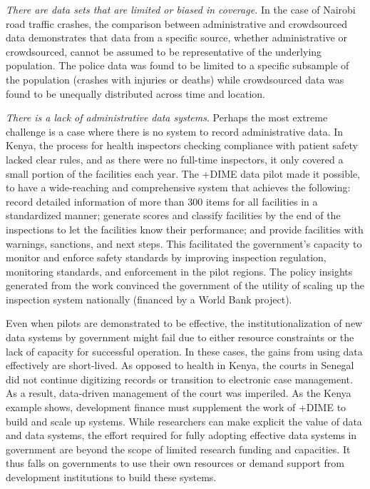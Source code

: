 \documentclass[
]{book}
\begin{document}
\emph{There are data sets that are limited or biased in coverage.} In the case of Nairobi road traffic crashes, the comparison between administrative and crowdsourced data demonstrates that data from a specific source, whether administrative or crowdsourced, cannot be assumed to be representative of the underlying population. The police data was found to be limited to a specific subsample of the population (crashes with injuries or deaths) while crowdsourced data was found to be unequally distributed across time and location.

\emph{There is a lack of administrative data systems}. Perhaps the most extreme challenge is a case where there is no system to record administrative data. In Kenya, the process for health inspectors checking compliance with patient safety lacked clear rules, and as there were no full-time inspectors, it only covered a small portion of the facilities each year. The +DIME\textbar{} data pilot made it possible, to have a wide-reaching and comprehensive system that achieves the following: record detailed information of more than 300 items for all facilities in a standardized manner; generate scores and classify facilities by the end of the inspections to let the facilities know their performance; and provide facilities with warnings, sanctions, and next steps. This facilitated the government's capacity to monitor and enforce safety standards by improving inspection regulation, monitoring standards, and enforcement in the pilot regions. The policy insights generated from the work convinced the government of the utility of scaling up the inspection system nationally (financed by a World Bank project).

Even when pilots are demonstrated to be effective, the institutionalization of new data systems by government might fail due to either resource constraints or the lack of capacity for successful operation. In these cases, the gains from using data effectively are short-lived. As opposed to health in Kenya, the courts in Senegal did not continue digitizing records or transition to electronic case management. As a result, data-driven management of the court was imperiled. As the Kenya example shows, development finance must supplement the work of +DIME\textbar{} to build and scale up systems. While researchers can make explicit the value of data and data systems, the effort required for fully adopting effective data systems in government are beyond the scope of limited research funding and capacities. It thus falls on governments to use their own resources or demand support from development institutions to build these systems.
\end{document}
